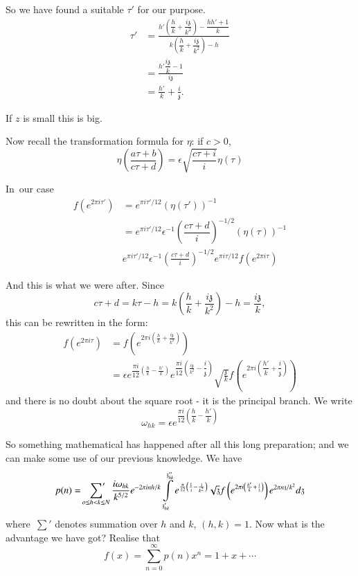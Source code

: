 So we have found a suitable $\tau'$ for our purpose.
\begin{align*}
  \tau' & = \frac{h' \left( \dfrac{h}{k} + \dfrac{i
      \mathfrak{z}}{k^2}\right) - \dfrac{hh'+1}{k}}{k \left(
    \dfrac{h}{k} + \dfrac{i \mathfrak{z}}{k^2}\right) - h}\\
  & = \frac{h' \dfrac{i \mathfrak{z}}{k} -1}{i \mathfrak{z}}\\
  & = \frac{h'}{k} + \frac{i}{\mathfrak{z}}.
\end{align*}

If $z$ is small this is big.

Now recall the transformation formula for $\eta$: if $c> 0$, 
$$
\eta \left( \frac{a \tau + b}{c \tau+d}\right) = \epsilon \sqrt{\frac{c
    \tau+i}{i}} \eta ( \tau) 
$$

In\pageoriginale\ our case
\begin{align*}
  f(e^{2 \pi i \tau'}) & = e^{\pi i \tau' /12} (\eta (\tau'))^{-1}\\
  & = e^{\pi i \tau'/12} \epsilon^{-1} \left( \dfrac{c \tau
    +d}{i}\right)^{-1/2} (\eta(\tau))^{-1}\\
  & e^{\pi i \tau'/12} \epsilon^{-1} \left( \frac{c \tau
    +d}{i}\right)^{-1/2} e^{\pi i \tau/12} f(e^{2 \pi i \tau})
\end{align*}

And this is what we were after. Since
$$
c \tau +d = k \tau -h =k \left( \frac{h}{k} + \frac{i
  \mathfrak{z}}{k^2}\right) -h = \frac{i \mathfrak{z}}{k},
$$
this can be rewritten in the form:
\begin{align*}
  f(e^{2 \pi i \tau}) & = f(e^{2 \pi i \left(\frac{h}{k} + \frac{i
      \mathfrak{z}}{k^2}\right)})\\
  & = \epsilon e^{\dfrac{\pi i}{12}\left(\frac{h}{k} - \frac{h'}{k} \right)}
    e^{\dfrac{\pi i}{12} \left( \frac{i \mathfrak{z}}{k^2} -
      \dfrac{i}{\mathfrak{z}} \right)} \sqrt{\frac{\mathfrak{z}}{k}}
    f \left(e^{2 \pi i \left( \dfrac{h'}{k} + \dfrac{i}{\mathfrak{z}}\right)}\right)
\end{align*}
and there is no doubt about the square root - it is the principal
branch. We write
$$
\omega_{hk}= \epsilon e^{\dfrac{\pi i}{12} \left(\dfrac{h}{k} - \dfrac{h'}{k} \right)}
$$

So something mathematical has happened after all this long
preparation; and we can make some use of our previous knowledge. We
have
$$
  p(n) = \sideset{}{'}\sum_{o \leq h < k \leq N} \frac{i \omega_{hk}}{k^{5/2}}
  e^{- 2 \pi i n h/k}
  \int\limits_{\mathfrak{z}'_{hk}}^{\mathfrak{z}''_{hk}}
  e^{\frac{\pi}{12} \left( \frac{1}{\mathfrak{z}} -
    \frac{\mathfrak{z}}{k^2}\right)} \sqrt{\mathfrak{z}} f \left(e^{2 \pi i
  \left( \frac{h'}{k} + \frac{i}{\mathfrak{z}}\right)}\right) e^{2 \pi n
    \mathfrak{z}/k^2} d \mathfrak{z}  
$$
where\pageoriginale\ $\sum'$ denotes summation over $h$ and $k$, $(h,
k)=1$. Now what is the advantage we have got? Realise that
$$
f(x) = \sum^\infty_{n=0} p(n) x^n = 1+x + \cdots
$$

